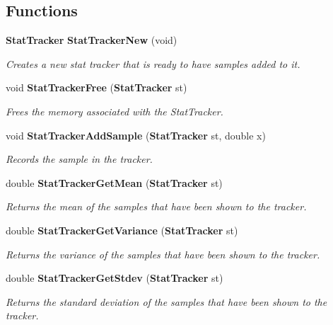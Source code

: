 \subsection*{Functions}
\begin{CompactItemize}
\item 
{\bf Stat\-Tracker} {\bf Stat\-Tracker\-New} (void)
\begin{CompactList}\small\item\em Creates a new stat tracker that is ready to have samples added to it. \item\end{CompactList}\item 
void {\bf Stat\-Tracker\-Free} ({\bf Stat\-Tracker} st)
\begin{CompactList}\small\item\em Frees the memory associated with the Stat\-Tracker. \item\end{CompactList}\item 
void {\bf Stat\-Tracker\-Add\-Sample} ({\bf Stat\-Tracker} st, double x)
\begin{CompactList}\small\item\em Records the sample in the tracker. \item\end{CompactList}\item 
double {\bf Stat\-Tracker\-Get\-Mean} ({\bf Stat\-Tracker} st)
\begin{CompactList}\small\item\em Returns the mean of the samples that have been shown to the tracker. \item\end{CompactList}\item 
double {\bf Stat\-Tracker\-Get\-Variance} ({\bf Stat\-Tracker} st)
\begin{CompactList}\small\item\em Returns the variance of the samples that have been shown to the tracker. \item\end{CompactList}\item 
double {\bf Stat\-Tracker\-Get\-Stdev} ({\bf Stat\-Tracker} st)
\begin{CompactList}\small\item\em Returns the standard deviation of the samples that have been shown to the tracker. \item\end{CompactList}\item 

\end{CompactItemize}

